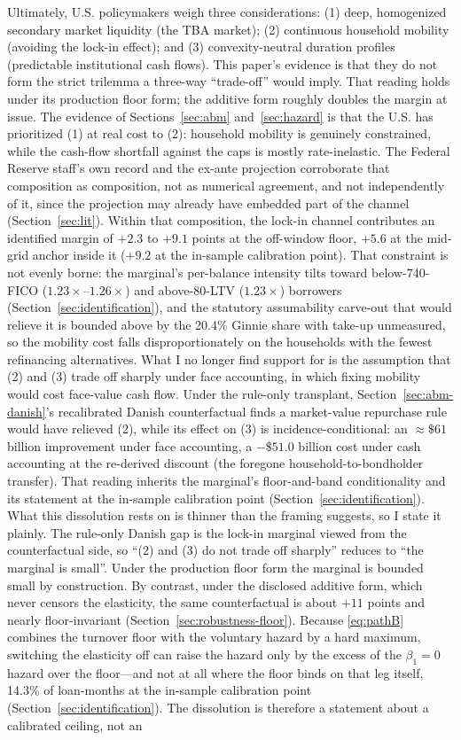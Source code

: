 \documentclass[12pt]{article}
\begin{document}
Ultimately, U.S. policymakers weigh three considerations: (1) deep, homogenized secondary market liquidity (the TBA market); (2) continuous household mobility (avoiding the lock-in effect); and (3) convexity-neutral duration profiles (predictable institutional cash flows). This paper's evidence is that they do not form the strict trilemma a three-way ``trade-off'' would imply. That reading holds under its production floor form; the additive form roughly doubles the margin at issue. The evidence of Sections~\ref{sec:abm} and~\ref{sec:hazard} is that the U.S. has prioritized (1) at real cost to (2): household mobility is genuinely constrained, while the cash-flow shortfall against the caps is mostly rate-inelastic. The Federal Reserve staff's own record and the ex-ante projection corroborate that composition as composition, not as numerical agreement, and not independently of it, since the projection may already have embedded part of the channel (Section~\ref{sec:lit}). Within that composition, the lock-in channel contributes an identified margin of $+2.3$ to $+9.1$ points at the off-window floor, $+5.6$ at the mid-grid anchor inside it ($+9.2$ at the in-sample calibration point). That constraint is not evenly borne: the marginal's per-balance intensity tilts toward below-740-FICO ($1.23\times$--$1.26\times$) and above-80-LTV ($1.23\times$) borrowers (Section~\ref{sec:identification}), and the statutory assumability carve-out that would relieve it is bounded above by the 20.4\% Ginnie share with take-up unmeasured, so the mobility cost falls disproportionately on the households with the fewest refinancing alternatives. What I no longer find support for is the assumption that (2) and (3) trade off sharply under face accounting, in which fixing mobility would cost face-value cash flow. Under the rule-only transplant, Section~\ref{sec:abm-danish}'s recalibrated Danish counterfactual finds a market-value repurchase rule would have relieved (2), while its effect on (3) is incidence-conditional: an $\approx\$61$ billion improvement under face accounting, a $-\$51.0$ billion cost under cash accounting at the re-derived discount (the foregone household-to-bondholder transfer). That reading inherits the marginal's floor-and-band conditionality and its statement at the in-sample calibration point (Section~\ref{sec:identification}). What this dissolution rests on is thinner than the framing suggests, so I state it plainly. The rule-only Danish gap is the lock-in marginal viewed from the counterfactual side, so ``(2) and (3) do not trade off sharply'' reduces to ``the marginal is small''. Under the production floor form the marginal is bounded small by construction. By contrast, under the disclosed additive form, which never censors the elasticity, the same counterfactual is about $+11$ points and nearly floor-invariant (Section~\ref{sec:robustness-floor}). Because \eqref{eq:pathB} combines the turnover floor with the voluntary hazard by a hard maximum, switching the elasticity off can raise the hazard only by the excess of the $\beta_1 = 0$ hazard over the floor---and not at all where the floor binds on that leg itself, 14.3\% of loan-months at the in-sample calibration point (Section~\ref{sec:identification}). The dissolution is therefore a statement about a calibrated ceiling, not an 
\end{document}
